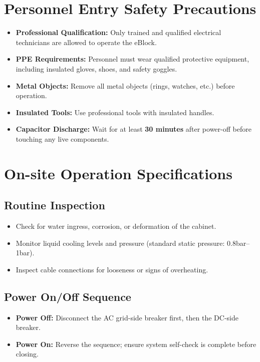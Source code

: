 \documentclass[11pt, a4paper]{article}
\begin{document}
\section{Personnel Entry Safety Precautions}
\begin{itemize}[leftmargin=1.5em]
    \item \textbf{Professional Qualification:} Only trained and qualified electrical technicians are allowed to operate the eBlock.
    \item \textbf{PPE Requirements:} Personnel must wear qualified protective equipment, including insulated gloves, shoes, and safety goggles.
    \item \textbf{Metal Objects:} Remove all metal objects (rings, watches, etc.) before operation.
    \item \textbf{Insulated Tools:} Use professional tools with insulated handles.
    \item \textbf{Capacitor Discharge:} Wait for at least \textbf{30 minutes} after power-off before touching any live components.
\end{itemize}

\section{On-site Operation Specifications}
\subsection{Routine Inspection}
\begin{itemize}
    \item Check for water ingress, corrosion, or deformation of the cabinet.
    \item Monitor liquid cooling levels and pressure (standard static pressure: 0.8bar--1bar).
    \item Inspect cable connections for looseness or signs of overheating.
\end{itemize}

\subsection{Power On/Off Sequence}
\begin{itemize}
    \item \textbf{Power Off:} Disconnect the AC grid-side breaker first, then the DC-side breaker.
    \item \textbf{Power On:} Reverse the sequence; ensure system self-check is complete before closing.
\end{itemize}
\end{document}
